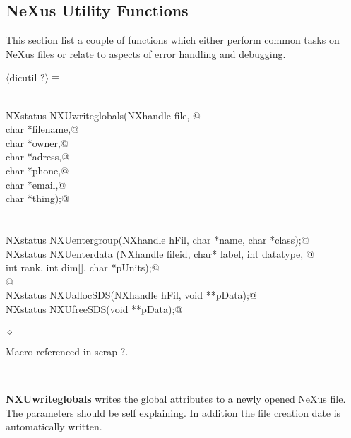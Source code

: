 \documentclass[12pt]{article}
\begin{document}
  
  \subsection{NeXus Utility Functions}
  This section list a couple of functions which either perform common 
   tasks on NeXus files or relate
  to aspects of error handling and debugging.

\begin{flushleft} \small
\begin{minipage}{\linewidth} \label{scrap4}
$\langle$dicutil {\footnotesize ?}$\rangle\equiv$
\vspace{-1ex}
\begin{list}{}{} \item
\mbox{}\verb@@\\
\mbox{}\verb@   NXstatus NXUwriteglobals(NXhandle file, @\\
\mbox{}\verb@                            char *filename,@\\
\mbox{}\verb@                            char *owner,@\\
\mbox{}\verb@                            char *adress,@\\
\mbox{}\verb@                            char *phone,@\\
\mbox{}\verb@                            char *email,@\\
\mbox{}\verb@                            char *thing);@\\
\mbox{}\verb@@\\
\mbox{}\verb@@\\
\mbox{}\verb@   NXstatus NXUentergroup(NXhandle hFil, char *name, char *class);@\\
\mbox{}\verb@   NXstatus NXUenterdata (NXhandle fileid, char* label, int datatype, @\\
\mbox{}\verb@                          int rank, int dim[], char *pUnits);@\\
\mbox{}\verb@   @\\
\mbox{}\verb@   NXstatus NXUallocSDS(NXhandle hFil, void **pData);@\\
\mbox{}\verb@   NXstatus NXUfreeSDS(void **pData);@\\
\mbox{}\verb@@\\
\mbox{}\verb@@$\diamond$
\end{list}
\vspace{-1ex}
\footnotesize\addtolength{\baselineskip}{-1ex}
\begin{list}{}{\setlength{\itemsep}{-\parsep}\setlength{\itemindent}{-\leftmargin}}
\item Macro referenced in scrap ?.
\end{list}
\end{minipage}\\[4ex]
\end{flushleft}
{\bf NXUwriteglobals} writes the global attributes to a newly opened 
 NeXus file. The parameters should be self explaining. In addition 
 the file creation date is automatically written.
\end{document}
